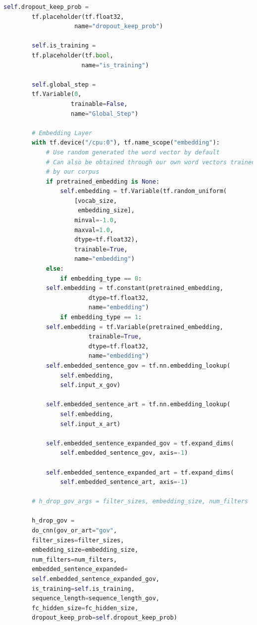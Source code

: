 \documentclass[sigconf]{acmart}
\begin{document}
\begin{appendices}
\begin{lstlisting}[breaklines, language=Python, frame=tlrb]
        self.dropout_keep_prob = 
        tf.placeholder(tf.float32,
                    name="dropout_keep_prob")

        self.is_training = 
        tf.placeholder(tf.bool,
                      name="is_training")

        self.global_step = 
        tf.Variable(0,
                   trainable=False,
                   name="Global_Step")

        # Embedding Layer
        with tf.device("/cpu:0"), tf.name_scope("embedding"):
            # Use random generated the word vector by default
            # Can also be obtained through our own word vectors trained
            # by our corpus
            if pretrained_embedding is None:
                self.embedding = tf.Variable(tf.random_uniform(
                    [vocab_size,
                     embedding_size],
                    minval=-1.0,
                    maxval=1.0,
                    dtype=tf.float32),
                    trainable=True,
                    name="embedding")
            else:
                if embedding_type == 0:
            self.embedding = tf.constant(pretrained_embedding,
                        dtype=tf.float32,
                        name="embedding")
                if embedding_type == 1:
            self.embedding = tf.Variable(pretrained_embedding,
                        trainable=True,
                        dtype=tf.float32,
                        name="embedding")
            self.embedded_sentence_gov = tf.nn.embedding_lookup(
                self.embedding,
                self.input_x_gov)

            self.embedded_sentence_art = tf.nn.embedding_lookup(
                self.embedding,
                self.input_x_art)

            self.embedded_sentence_expanded_gov = tf.expand_dims(
                self.embedded_sentence_gov, axis=-1)

            self.embedded_sentence_expanded_art = tf.expand_dims(
                self.embedded_sentence_art, axis=-1)

        # h_drop_gov_args = filter_sizes, embedding_size, num_filters

        h_drop_gov = 
        do_cnn(gov_or_art="gov",
        filter_sizes=filter_sizes,
        embedding_size=embedding_size,
        num_filters=num_filters,
        embedded_sentence_expanded=
        self.embedded_sentence_expanded_gov,
        is_training=self.is_training,
        sequence_length=sequence_length_gov,
        fc_hidden_size=fc_hidden_size,
        dropout_keep_prob=self.dropout_keep_prob)


\end{lstlisting}
\end{appendices}
\end{document}

